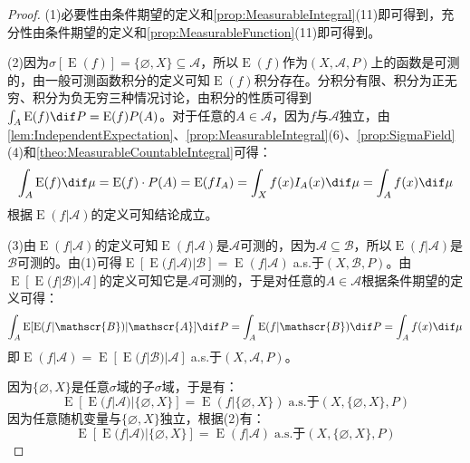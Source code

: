 \begin{proof}
	(1)必要性由条件期望的定义和\cref{prop:MeasurableIntegral}(11)即可得到，充分性由条件期望的定义和\cref{prop:MeasurableFunction}(11)即可得到。\par
	(2)因为$\sigma[\operatorname{E}(f)]=\{\varnothing,X\}\subseteq\mathscr{A}$，所以$\operatorname{E}(f)$作为$(X,\mathscr{A},P)$上的函数是可测的，由一般可测函数积分的定义可知$\operatorname{E}(f)$积分存在。分积分有限、积分为正无穷、积分为负无穷三种情况讨论，由积分的性质可得到$\int_{A}\operatorname{E}(f)\dif P=\operatorname{E}(f)P(A)$。对于任意的$A\in\mathscr{A}$，因为$f$与$\mathscr{A}$独立，由\cref{lem:IndependentExpectation}、\cref{prop:MeasurableIntegral}(6)、\cref{prop:SigmaField}(4)和\cref{theo:MeasurableCountableIntegral}可得：
	\begin{equation*}
		\int_{A}\operatorname{E}(f)\dif\mu=\operatorname{E}(f)\cdot P(A)=\operatorname{E}(fI_A)=\int_{X}f(x)I_A(x)\dif\mu=\int_{A}f(x)\dif\mu
	\end{equation*}
	根据$\operatorname{E}(f|\mathscr{A})$的定义可知结论成立。\par
	(3)由$\operatorname{E}(f|\mathscr{A})$的定义可知$\operatorname{E}(f|\mathscr{A})$是$\mathscr{A}$可测的，因为$\mathscr{A}\subseteq\mathscr{B}$，所以$\operatorname{E}(f|\mathscr{A})$是$\mathscr{B}$可测的。由(1)可得$\operatorname{E}[\operatorname{E}(f|\mathscr{A})|\mathscr{B}]=\operatorname{E}(f|\mathscr{A})\;$a.s.于$(X,\mathscr{B},P)$。由$\operatorname{E}[\operatorname{E}(f|\mathscr{B})|\mathscr{A}]$的定义可知它是$\mathscr{A}$可测的，于是对任意的$A\in\mathscr{A}$根据条件期望的定义可得：
	\begin{equation*}
		\int_{A}\operatorname{E}[\operatorname{E}(f|\mathscr{B})|\mathscr{A}]\dif P=\int_{A}\operatorname{E}(f|\mathscr{B})\dif P=\int_{A}f(x)\dif\mu
	\end{equation*}
	即$\operatorname{E}(f|\mathscr{A})=\operatorname{E}[\operatorname{E}(f|\mathscr{B})|\mathscr{A}]\;$a.s.于$(X,\mathscr{A},P)$。\par
	因为$\{\varnothing,X\}$是任意$\sigma$域的子$\sigma$域，于是有：
	\begin{equation*}
		\operatorname{E}[\operatorname{E}(f|\mathscr{A})|\{\varnothing,X\}]=\operatorname{E}(f|\{\varnothing,X\})\;\text{a.s.于}(X,\{\varnothing,X\},P)
	\end{equation*}
	因为任意随机变量与$\{\varnothing,X\}$独立，根据(2)有：
	\begin{equation*}
		\operatorname{E}[\operatorname{E}(f|\mathscr{A})|\{\varnothing,X\}]=\operatorname{E}(f|\mathscr{A})\;\text{a.s.于}(X,\{\varnothing,X\},P)

\end{equation*}
\end{proof}
